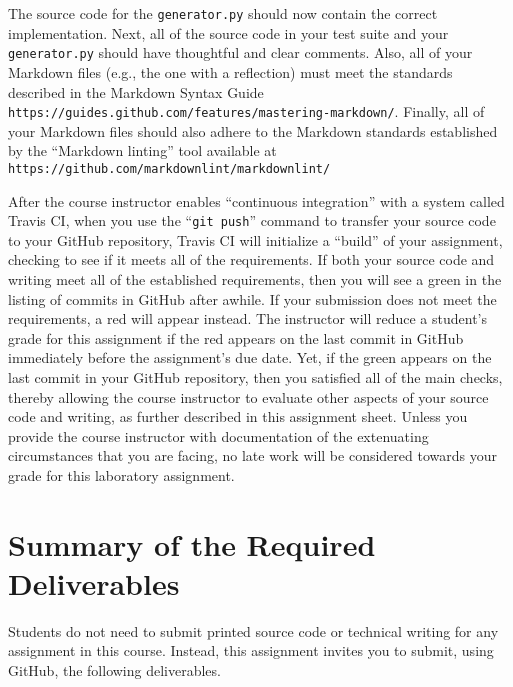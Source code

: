 \documentclass[11pt]{article}
\newcommand{\mainprogram}{\lstinline{generator.py}}
\newcommand{\gitpush}{\command{git push}}
\newcommand{\command}[1]{``\lstinline{#1}''}
\newcommand{\url}[1]{\lstinline{#1}}
\newcommand{\step}[1]{``{#1}''}
\newcommand{\checkmark}{\ding{51}}
\newcommand{\naughtmark}{\ding{55}}
\begin{document}
The source code for the \mainprogram{} should now contain the correct implementation. Next, all of the source code in
your test suite and your \mainprogram{} should have thoughtful and clear comments. Also, all of your Markdown files
(e.g., the one with a reflection) must meet the standards described in the Markdown Syntax Guide
\url{https://guides.github.com/features/mastering-markdown/}. Finally, all of your Markdown files should also adhere to
the Markdown standards established by the \step{Markdown linting} tool available at
\url{https://github.com/markdownlint/markdownlint/}

After the course instructor enables \step{continuous integration} with a system called Travis CI, when you use the
\gitpush{} command to transfer your source code to your GitHub repository, Travis CI will initialize a \step{build} of
your assignment, checking to see if it meets all of the requirements. If both your source code and writing meet all of
the established requirements, then you will see a green \checkmark{} in the listing of commits in GitHub after awhile.
If your submission does not meet the requirements, a red \naughtmark{} will appear instead. The instructor will reduce a
student's grade for this assignment if the red \naughtmark{} appears on the last commit in GitHub immediately before the
assignment's due date. Yet, if the green \checkmark{} appears on the last commit in your GitHub repository, then you
satisfied all of the main checks, thereby allowing the course instructor to evaluate other aspects of your source code
and writing, as further described in this assignment sheet. Unless you provide the course instructor with documentation
of the extenuating circumstances that you are facing, no late work will be considered towards your grade for this
laboratory assignment.

\section*{Summary of the Required Deliverables}

\noindent Students do not need to submit printed source code or technical writing for any assignment in this course.
Instead, this assignment invites you to submit, using GitHub, the following deliverables.
\end{document}
